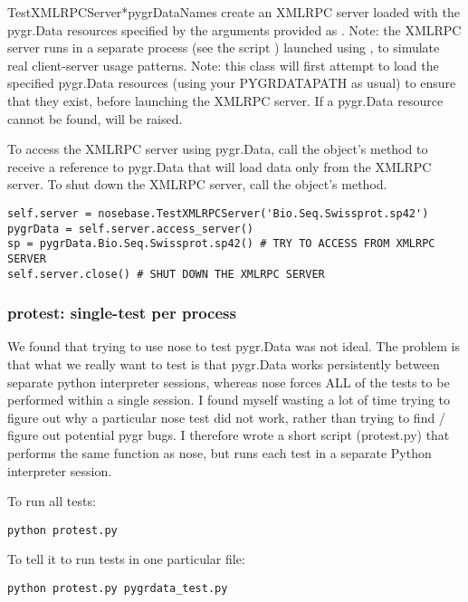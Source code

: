 \documentclass{howto}
\begin{document}
\begin{funcdesc}{TestXMLRPCServer}{*pygrDataNames}
  create an XMLRPC server loaded with the pygr.Data resources specified
  by the arguments provided as .  Note: the XMLRPC server
  runs in a separate process (see the script )
  launched using , to simulate
  real client-server usage patterns.  Note: this class will first attempt to
  load the specified pygr.Data resources (using your PYGRDATAPATH as usual)
  to ensure that they exist, before launching the XMLRPC server.  If a pygr.Data
  resource cannot be found,  will be raised.

  To access the XMLRPC server
  using pygr.Data, call the object's  method to receive a reference
  to pygr.Data that will load data only from the XMLRPC server.  To shut down the
  XMLRPC server, call the object's  method.
\begin{verbatim}
self.server = nosebase.TestXMLRPCServer('Bio.Seq.Swissprot.sp42')
pygrData = self.server.access_server()
sp = pygrData.Bio.Seq.Swissprot.sp42() # TRY TO ACCESS FROM XMLRPC SERVER
self.server.close() # SHUT DOWN THE XMLRPC SERVER
\end{verbatim}
\end{funcdesc}


\subsubsection{protest: single-test per process}
We found that trying to use nose to test pygr.Data was not ideal.  
The problem is that what we really want to test is that pygr.Data works persistently 
between separate python interpreter sessions, whereas nose forces ALL of the tests 
to be performed within a single session.  I found myself wasting a lot of time 
trying to figure out why a particular nose test did not work, 
rather than trying to find / figure out potential pygr bugs.  
I therefore wrote a short script (protest.py) that performs the 
same function as nose, but runs each test in a separate Python 
interpreter session.   

To run all tests:

\begin{verbatim}
python protest.py
\end{verbatim}
To tell it to run tests in one particular file:
\begin{verbatim}
python protest.py pygrdata_test.py
\end{verbatim}
\end{document}
